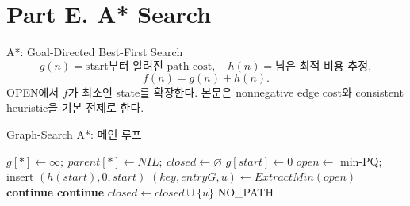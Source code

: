 \section{Part E. A* Search}
\begin{frame}{A*: Goal-Directed Best-First Search}
\[
g(n)=\text{start부터 알려진 path cost},\quad
h(n)=\text{남은 최적 비용 추정},
\]
\[
f(n)=g(n)+h(n).
\]
OPEN에서 \(f\)가 최소인 state를 확장한다. 본문은 nonnegative edge cost와 consistent heuristic을 기본 전제로 한다.
\end{frame}
\begin{frame}{Graph-Search A*: 메인 루프}
\algofont
\begin{algorithmic}[1]
  \State \(g[*]\gets\infty;\ parent[*]\gets NIL;\ closed\gets\varnothing\)
  \State \(g[start]\gets0\)
  \State \(open\gets\) min-PQ; insert \((h(start),0,start)\)
    \State \((key,entryG,u)\gets ExtractMin(open)\)
     \State \textbf{continue}  \EndIf
     \State \textbf{continue} \EndIf
    \State \(closed\gets closed\cup\{u\}\)
     \State \Return {} \EndIf
    \State {} 
  \EndWhile
  \State \Return NO\_PATH
\EndProcedure
\end{algorithmic}
\vfill
{}
\end{frame}

